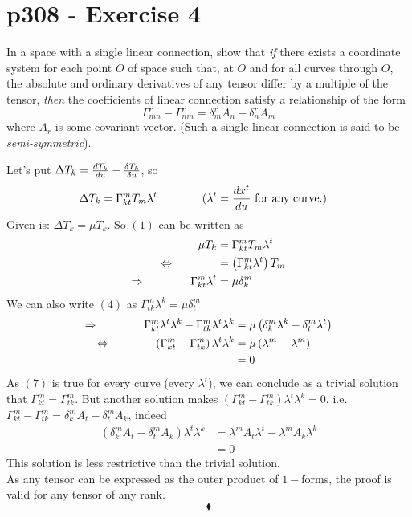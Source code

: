\section{p308 - Exercise 4}
\begin{tcolorbox}
In a space with a single linear connection, show that \textit{if} there exists a coordinate system for each point $O$ of space such that, at $O$ and for all curves through $O$, the absolute and ordinary derivatives of any tensor differ by a multiple of the tensor, \textit{then }the coefficients of linear connection satisfy a relationship of the form 
$$\Gamma^r_{mn}-\Gamma^r_{nm} = \delta^r_mA_n - \delta^r_n A_m$$
where $A_r$ is some covariant vector. (Such a single linear connection is said to be \textit{semi-symmetric}).
\end{tcolorbox}
Let's put $\Delta T_k = \dv{T_k}{u} - \fdv{T_k}{u}$, so
\begin{align}
\Delta T_k&= \Gamma^m_{kt}T_m\lambda^t\quad\quad\quad\quad (\lambda^t = \dv{x^t}{u}\text{ for any curve.})
\end{align}
Given is: $ \Delta T_k = \mu T_k$. So $(1)$ can be written as 
\begin{align}
\mu T_k&= \Gamma^m_{kt}T_m\lambda^t\\
\Leftrightarrow\quad\quad\quad\quad &= \left(\Gamma^m_{kt}\lambda^t\right)T_m\\
\Rightarrow\quad\quad\quad\quad \Gamma^m_{kt}\lambda^t &= \mu \delta^m_k
\end{align}
We can also write $(4)$ as $ \Gamma^m_{tk}\lambda^k = \mu \delta^m_t$
\begin{align}
\Rightarrow\quad\quad\quad\quad \Gamma^m_{kt}\lambda^t\lambda^k-\Gamma^m_{tk}\lambda^t\lambda^k &= \mu \left(\delta^m_k\lambda^k- \delta^m_t\lambda^t\right)\\
\Leftrightarrow\quad\quad\quad\quad \left(\Gamma^m_{kt}-\Gamma^m_{tk}\right)\lambda^t\lambda^k &= \mu \left(\lambda^m- \lambda^m\right)\\
&=0
\end{align}
As $(7)$ is true for every curve (every $\lambda^t$), we can conclude as a  trivial solution that $\Gamma^m_{kt}=\Gamma^m_{tk}$. But another solution makes $\left(\Gamma^m_{kt}-\Gamma^m_{tk}\right)\lambda^t\lambda^k  =0$, i.e. $ \Gamma^m_{kt}-\Gamma^m_{tk}= \delta^m_kA_t - \delta^m_tA_k $, indeed
\begin{align}
\left(\delta^m_kA_t - \delta^m_tA_k\right)\lambda^t\lambda^k &=  \lambda^mA_t\lambda^t-\lambda^mA_k\lambda^k\\
&=0
\end{align}
This  solution is less restrictive than the trivial solution. \\
As any tensor can be expressed as the outer product of $1-$forms, the proof is valid for any tensor of any rank.
$$\blacklozenge$$\\
\newpage



